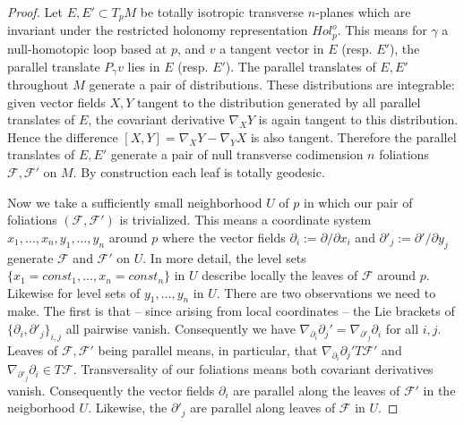 \documentclass[12pt]{amsart}
\theoremstyle{definition}
\theoremstyle{remark}
\newcommand{\sF}{\mathscr{F}}
\newcommand{\del}{\partial}
\begin{document}
\begin{proof}
Let $E,E' \subset T_p M$ be totally isotropic transverse $n$-planes which are invariant under the restricted holonomy representation $Hol^o_p$. This means for $\gamma$ a null-homotopic loop based at $p$, and $v$ a tangent vector in $E$ (resp. $E'$), the parallel translate $P_\gamma v$ lies in $E$ (resp. $E'$). The parallel translates of $E,E'$ throughout $M$ generate a pair of distributions. These distributions are integrable: given vector fields $X,Y$ tangent to the distribution generated by all parallel translates of $E$, the covariant derivative $\nabla_X Y$ is again tangent to this distribution. Hence the difference $[X,Y]=\nabla_X Y - \nabla_Y X$ is also tangent. Therefore the parallel translates of $E,E'$ generate a pair of null transverse codimension $n$ foliations $\sF,\sF'$ on $M$. By construction each leaf is totally geodesic. 

Now we take a sufficiently small neighborhood $U$ of $p$ in which our pair of foliations $(\sF, \sF')$ is trivialized. This means a coordinate system $x_1, \ldots, x_n, y_1, \ldots, y_n$ around $p$ where the vector fields $\del_i:=\del/\del x_i$ and $\del'_j:=\del'/\del y_j$ generate $\sF$ and $\sF'$ on $U$. In more detail, the level sets $\{x_1=const_1, \ldots, x_n=const_n\}$ in $U$ describe locally the leaves of $\sF$ around $p$. Likewise for level sets of $y_1, \ldots, y_n$ in $U$. There are two observations we need to make. The first is that -- since arising from local coordinates -- the Lie brackets of $\{\del_i, \del'_j\}_{i,j}$ all pairwise vanish. Consequently we have $\nabla_{\del_i}\del_j'=\nabla_{\del'_j}\del_i$ for all $i,j$. Leaves of $\sF, \sF'$ being parallel means, in particular, that $\nabla_{\del_i}\del_j' T \sF'$ and $\nabla_{\del'_j}\del_i \in T\sF$. Transversality of our foliations means both covariant derivatives vanish. Consequently the vector fields $\del_i$ are parallel along the leaves of $\sF'$ in the neigborhood $U$. Likewise, the $\del'_j$ are parallel along leaves of $\sF$ in $U$. 


\end{proof}
\end{document}
